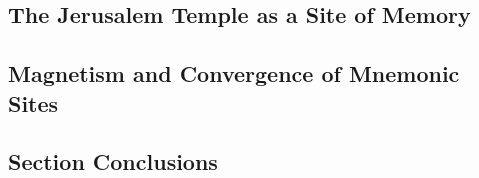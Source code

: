 


\subsection{The Jerusalem Temple as a Site of Memory}

\subsection{Magnetism and Convergence of Mnemonic Sites}

\subsection*{Section Conclusions}

